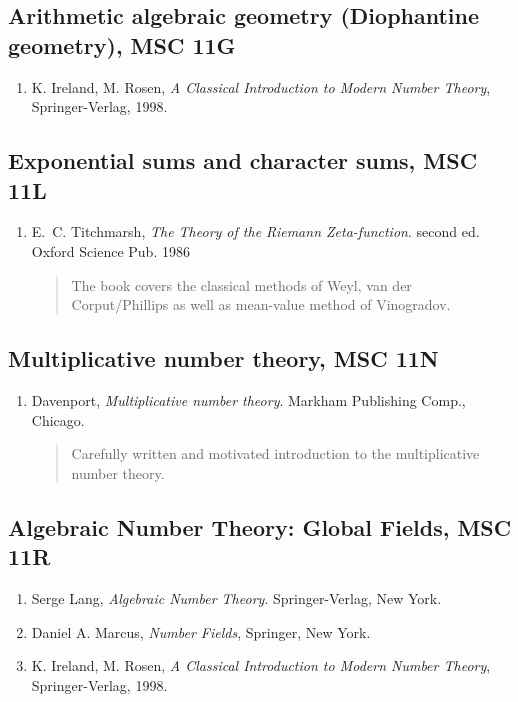 \documentclass[12pt]{article}
\begin{document}
\subsection*{Arithmetic algebraic geometry (Diophantine geometry), MSC 11G}
\begin{enumerate}
\item K. Ireland, M. Rosen, {\em A Classical Introduction to Modern Number Theory}, Springer-Verlag, 1998.
\end{enumerate}

\subsection*{Exponential sums and character sums, MSC 11L}
\begin{enumerate}
\item E.~C. Titchmarsh, {\em The Theory of the Riemann Zeta-function}. second ed. Oxford Science Pub. 1986
\begin{quote}
The book covers the classical methods of Weyl, van der Corput/Phillips as well as mean-value method of Vinogradov.
\end{quote}
\end{enumerate}

\subsection*{Multiplicative number theory, MSC 11N}
\begin{enumerate}
\item Davenport, {\em Multiplicative number theory}. Markham Publishing Comp., Chicago.
\begin{quote}
Carefully written and motivated introduction to the multiplicative number theory.
\end{quote}
\end{enumerate}

\subsection*{Algebraic Number Theory: Global Fields, MSC 11R}
\begin{enumerate}
\item Serge Lang, {\em Algebraic Number Theory}. Springer-Verlag, New York.
\item Daniel A. Marcus, {\em Number Fields}, Springer, New York.
\item K. Ireland, M. Rosen, {\em A Classical Introduction to Modern Number Theory}, Springer-Verlag, 1998.
\end{enumerate}
\end{document}

